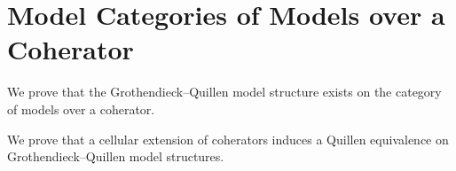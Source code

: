 \section{Model Categories of Models over a Coherator} \label{sec: model categories of models over a coherator}

We prove that the Grothendieck--Quillen model structure exists on the category of models over a coherator.

We prove that a cellular extension of coherators induces a Quillen equivalence on Grothendieck--Quillen model structures.